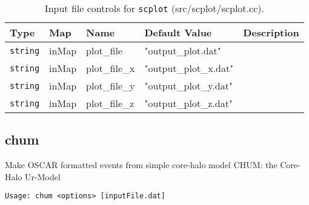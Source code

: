 \documentclass[10pt]{article}
\begin{document}
{        \begin{table}
            \begin{tabular}{lllll}
                \hline\hline
                Type & Map & Name & Default Value & Description \\
                \hline\hline 
                {\tt string} & inMap & plot\_file & "output\_plot.dat" & \\\hline
                {\tt string} & inMap & plot\_file\_x & "output\_plot\_x.dat" & \\\hline
                {\tt string} & inMap & plot\_file\_y & "output\_plot\_y.dat" & \\\hline
                {\tt string} & inMap & plot\_file\_z & "output\_plot\_z.dat" & \\\hline
            \end{tabular}
            \caption{Input file controls for {\tt scplot} (src/scplot/scplot.cc). }
        \end{table}






\subsection{chum}
Make OSCAR formatted events from simple core-halo model
CHUM: the Core-Halo Ur-Model


{\tt Usage: chum <options> [inputFile.dat]}
 

}
\end{document}

